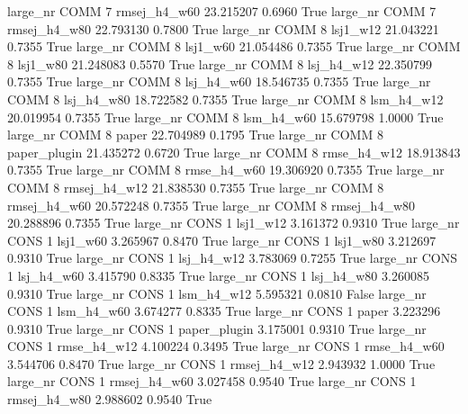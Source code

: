   large_nr     COMM                 7 rmsej_h4_w60   23.215207      0.6960    True
  large_nr     COMM                 7 rmsej_h4_w80   22.793130      0.7800    True
  large_nr     COMM                 8     lsj1_w12   21.043221      0.7355    True
  large_nr     COMM                 8     lsj1_w60   21.054486      0.7355    True
  large_nr     COMM                 8     lsj1_w80   21.248083      0.5570    True
  large_nr     COMM                 8   lsj_h4_w12   22.350799      0.7355    True
  large_nr     COMM                 8   lsj_h4_w60   18.546735      0.7355    True
  large_nr     COMM                 8   lsj_h4_w80   18.722582      0.7355    True
  large_nr     COMM                 8   lsm_h4_w12   20.019954      0.7355    True
  large_nr     COMM                 8   lsm_h4_w60   15.679798      1.0000    True
  large_nr     COMM                 8        paper   22.704989      0.1795    True
  large_nr     COMM                 8 paper_plugin   21.435272      0.6720    True
  large_nr     COMM                 8  rmse_h4_w12   18.913843      0.7355    True
  large_nr     COMM                 8  rmse_h4_w60   19.306920      0.7355    True
  large_nr     COMM                 8 rmsej_h4_w12   21.838530      0.7355    True
  large_nr     COMM                 8 rmsej_h4_w60   20.572248      0.7355    True
  large_nr     COMM                 8 rmsej_h4_w80   20.288896      0.7355    True
  large_nr     CONS                 1     lsj1_w12    3.161372      0.9310    True
  large_nr     CONS                 1     lsj1_w60    3.265967      0.8470    True
  large_nr     CONS                 1     lsj1_w80    3.212697      0.9310    True
  large_nr     CONS                 1   lsj_h4_w12    3.783069      0.7255    True
  large_nr     CONS                 1   lsj_h4_w60    3.415790      0.8335    True
  large_nr     CONS                 1   lsj_h4_w80    3.260085      0.9310    True
  large_nr     CONS                 1   lsm_h4_w12    5.595321      0.0810   False
  large_nr     CONS                 1   lsm_h4_w60    3.674277      0.8335    True
  large_nr     CONS                 1        paper    3.223296      0.9310    True
  large_nr     CONS                 1 paper_plugin    3.175001      0.9310    True
  large_nr     CONS                 1  rmse_h4_w12    4.100224      0.3495    True
  large_nr     CONS                 1  rmse_h4_w60    3.544706      0.8470    True
  large_nr     CONS                 1 rmsej_h4_w12    2.943932      1.0000    True
  large_nr     CONS                 1 rmsej_h4_w60    3.027458      0.9540    True
  large_nr     CONS                 1 rmsej_h4_w80    2.988602      0.9540    True
